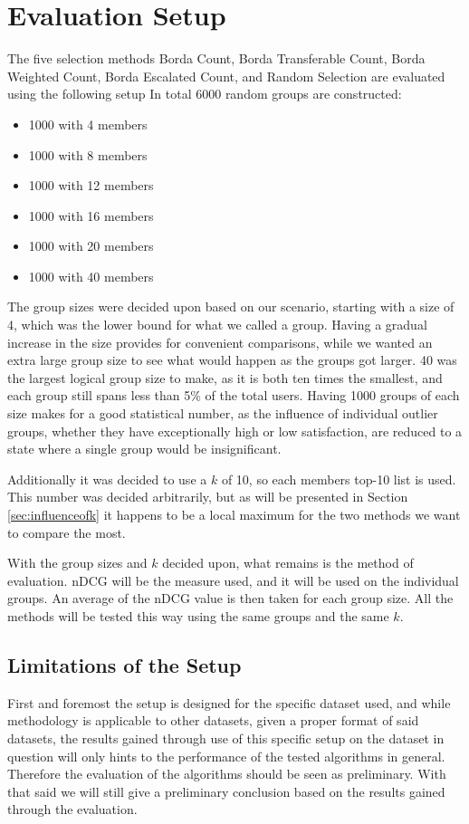 \section{Evaluation Setup} \label{sec:evaluationsetup}
The five selection methods Borda Count, Borda Transferable Count, Borda Weighted Count, Borda Escalated Count, and Random Selection are evaluated using the following setup
In total 6000 random groups are constructed:

\begin{itemize}
	\item 1000 with 4 members
	\item 1000 with 8 members
	\item 1000 with 12 members
	\item 1000 with 16 members
	\item 1000 with 20 members
	\item 1000 with 40 members
\end{itemize}

The group sizes were decided upon based on our scenario, starting with a size of 4, which was the lower bound for what we called a group. Having a gradual increase in the size provides for convenient comparisons, while we wanted an extra large group size to see what would happen as the groups got larger. 40 was the largest logical group size to make, as it is both ten times the smallest, and each group still spans less than 5\% of the total users.
Having 1000 groups of each size makes for a good statistical number, as the influence of individual outlier groups, whether they have exceptionally high or low satisfaction, are reduced to a state where a single group would be insignificant.

Additionally it was decided to use a $k$ of 10, so each members top-10 list is used. This number was decided arbitrarily, but as will be presented in Section \ref{sec:influenceofk} it happens to be a local maximum for the two methods we want to compare the most.

With the group sizes and $k$ decided upon, what remains is the method of evaluation. nDCG will be the measure used, and it will be used on the individual groups. An average of the nDCG value is then taken for each group size. All the methods will be tested this way using the same groups and the same $k$.

\subsection{Limitations of the Setup} \label{sec:limitsetup}
First and foremost the setup is designed for the specific dataset used, and while methodology is applicable to other datasets, given a proper format of said datasets, the results gained through use of this specific setup on the dataset in question will only hints to the performance of the tested algorithms in general. Therefore the evaluation of the algorithms should be seen as preliminary. With that said we will still give a preliminary conclusion based on the results gained through the evaluation.\\

